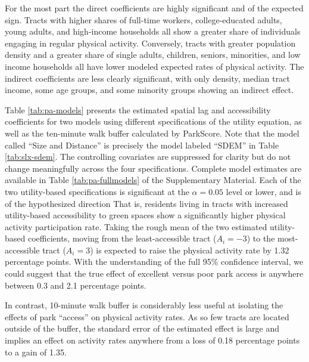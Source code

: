 \documentclass[Crown,sageh.bst]{sagej}
\begin{document}
For the most part the direct coefficients are highly significant and of
the expected sign. Tracts with higher shares of full-time workers,
college-educated adults, young adults, and high-income households all
show a greater share of individuals engaging in regular physical
activity. Conversely, tracts with greater population density and a
greater share of single adults, children, seniors, minorities, and low
income households all have lower modeled expected rates of physical
activity. The indirect coefficients are less clearly significant, with
only density, median tract income, some age groups, and some minority
groups showing an indirect effect.

Table \ref{tab:pa-models} presents the estimated spatial lag and
accessibility coefficients for two models using different specifications
of the utility equation, as well as the ten-minute walk buffer
calculated by ParkScore. Note that the model called ``Size and
Distance'' is precisely the model labeled ``SDEM'' in Table
\ref{tab:slx-sdem}. The controlling covariates are suppressed for
clarity but do not change meaningfully across the four specifications.
Complete model estimates are available in Table \ref{tab:pa-fullmodels}
of the Supplementary Material. Each of the two utility-based
specifications is significant at the \(\alpha = 0.05\) level or lower,
and is of the hypothesized direction That is, residents living in tracts
with increased utility-based accessibility to green spaces show a
significantly higher physical activity participation rate. Taking the
rough mean of the two estimated utility-based coefficients, moving from
the least-accessible tract (\(A_i = -3\)) to the most-accessible tract
(\(A_i = 3\)) is expected to raise the physical activity rate by 1.32
percentage points. With the understanding of the full 95\% confidence
interval, we could suggest that the true effect of excellent versus poor
park access is anywhere between 0.3 and 2.1 percentage points.

In contrast, 10-minute walk buffer is considerably less useful at
isolating the effects of park ``access'' on physical activity rates. As
so few tracts are located outside of the buffer, the standard error of
the estimated effect is large and implies an effect on activity rates
anywhere from a loss of 0.18 percentage points to a gain of 1.35.
\end{document}
